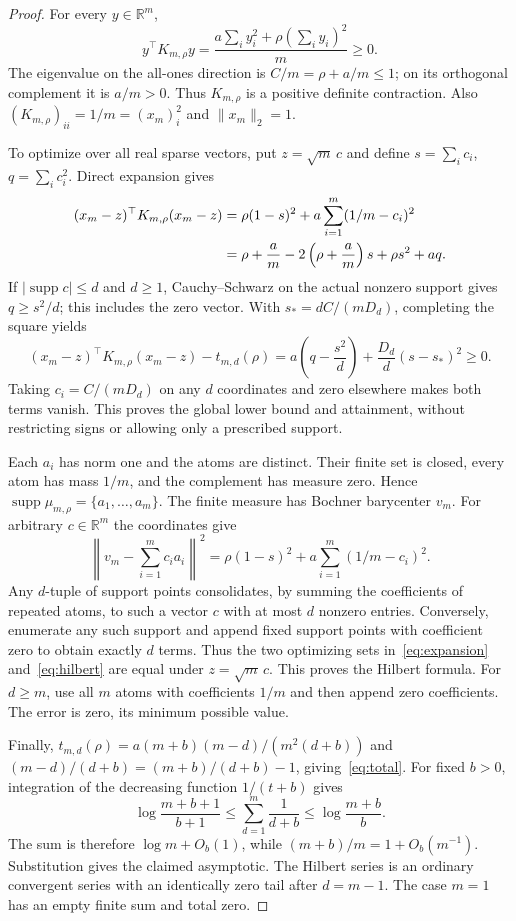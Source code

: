 \documentclass[11pt]{article}
\newcommand{\R}{\mathbb R}
\newcommand{\supp}{\operatorname{supp}}
\begin{document}
\begin{proof}
For every $y\in\R^m$,
\[
 y^\top K_{m,\rho}y=\frac{a\sum_i y_i^2+\rho(\sum_i y_i)^2}{m}\geq0.
\]
The eigenvalue on the all-ones direction is $C/m=\rho+a/m\leq1$;
on its orthogonal complement it is $a/m>0$.
Thus $K_{m,\rho}$ is a positive definite contraction.
Also $(K_{m,\rho})_{ii}=1/m=(x_m)_i^2$ and $\|x_m\|_2=1$.

To optimize over all real sparse vectors, put $z=\sqrt m\,c$ and define
$s=\sum_i c_i$, $q=\sum_i c_i^2$. Direct expansion gives
\begin{align}\label{eq:expansion}
 (x_m-z)^\top K_{m,\rho}(x_m-z)
 &=\rho(1-s)^2+a\sum_{i=1}^m(1/m-c_i)^2\notag\\
 &=\rho+\frac am-2\left(\rho+\frac am\right)s+\rho s^2+aq.
\end{align}
If $|\supp c|\leq d$ and $d\geq1$, Cauchy--Schwarz on the actual nonzero
support gives $q\geq s^2/d$; this includes the zero vector.
With $s_*=dC/(mD_d)$, completing the square yields
\begin{equation}\label{eq:completion}
 (x_m-z)^\top K_{m,\rho}(x_m-z)-t_{m,d}(\rho)
 =a\left(q-\frac{s^2}{d}\right)
   +\frac{D_d}{d}(s-s_*)^2\geq0.
\end{equation}
Taking $c_i=C/(mD_d)$ on any $d$ coordinates and zero elsewhere
makes both terms vanish. This proves the global lower bound and attainment,
without restricting signs or allowing only a prescribed support.

Each $a_i$ has norm one and the atoms are distinct. Their finite set is
closed, every atom has mass $1/m$, and the complement has measure zero.
Hence $\supp\mu_{m,\rho}=\{a_1,\ldots,a_m\}$. The finite measure has Bochner
barycenter $v_m$. For arbitrary $c\in\R^m$ the coordinates give
\begin{equation}\label{eq:hilbert}
 \left\|v_m-\sum_{i=1}^m c_i a_i\right\|^2
 =\rho(1-s)^2+a\sum_{i=1}^m(1/m-c_i)^2.
\end{equation}
Any $d$-tuple of support points consolidates, by summing the coefficients
of repeated atoms, to such a vector $c$ with at most $d$ nonzero entries.
Conversely, enumerate any such support and append fixed support points with
coefficient zero to obtain exactly $d$ terms. Thus the two optimizing sets
in~\eqref{eq:expansion} and~\eqref{eq:hilbert} are equal under
$z=\sqrt m\,c$. This proves the Hilbert formula. For $d\geq m$, use all
$m$ atoms with coefficients $1/m$ and then append zero coefficients.
The error is zero, its minimum possible value.

Finally, $t_{m,d}(\rho)=a(m+b)(m-d)/(m^2(d+b))$ and
$(m-d)/(d+b)=(m+b)/(d+b)-1$, giving~\eqref{eq:total}.
For fixed $b>0$, integration of the decreasing function $1/(t+b)$ gives
\[
 \log\frac{m+b+1}{b+1}\leq\sum_{d=1}^m\frac1{d+b}
 \leq\log\frac{m+b}{b}.
\]
The sum is therefore $\log m+O_b(1)$, while $(m+b)/m=1+O_b(m^{-1})$.
Substitution gives the claimed asymptotic.
The Hilbert series is an ordinary convergent series with an identically zero
tail after $d=m-1$. The case $m=1$ has an empty finite sum and total zero.
\end{proof}
\end{document}
